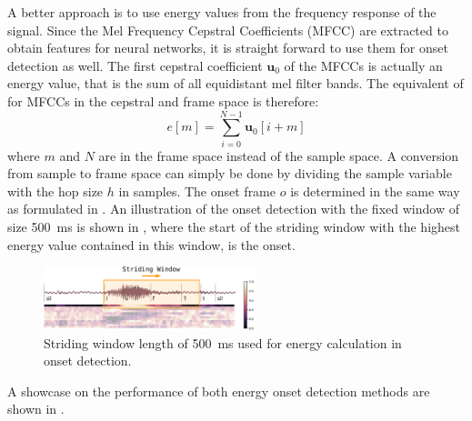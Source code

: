A better approach is to use energy values from the frequency response of the signal.
Since the Mel Frequency Cepstral Coefficients (MFCC) are extracted to obtain features for neural networks, it is straight forward to use them for onset detection as well.
The first cepstral coefficient $\bm{u}_0$ of the MFCCs is actually an energy value, that is the sum of all equidistant mel filter bands.
The equivalent of  for MFCCs in the cepstral and frame space is therefore:
\begin{equation}
  e[m] = \sum_{i=0}^{N-1} \bm{u}_0[i + m]
\end{equation}
where $m$ and $N$ are in the frame space instead of the sample space.
A conversion from sample to frame space can simply be done by dividing the sample variable with the hop size $h$ in samples.
The onset frame $o$ is determined in the same way as formulated in .
An illustration of the onset detection with the fixed window of size \SI{500}{\milli\second} is shown in , where
the start of the striding window with the highest energy value contained in this window, is the onset.
\begin{figure}[!ht]
  \centering
    \includegraphics[width=0.55\textwidth]{./3_signal/figs/signal_onset_window}
  \caption{Striding window length of \SI{500}{\milli\second} used for energy calculation in onset detection.}
  \label{fig:signal_onset_window}
\end{figure}
\FloatBarrier
\noindent
A showcase on the performance of both energy onset detection methods are shown in .
